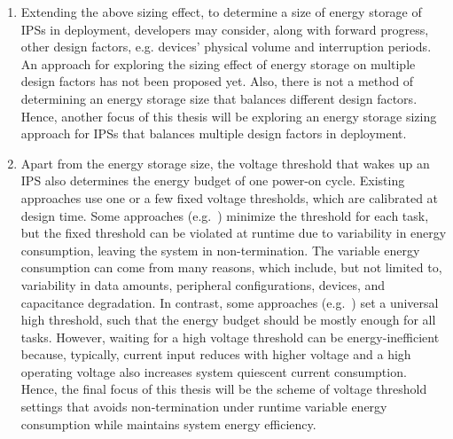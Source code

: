 \begin{enumerate}
\item 
Extending the above sizing effect, to determine a size of energy storage of IPSs in deployment, developers may consider, along with forward progress, other design factors, e.g. devices' physical volume and interruption periods. 
An approach for exploring the sizing effect of energy storage on multiple design factors has not been proposed yet. 
Also, there is not a method of determining an energy storage size that balances different design factors. 
Hence, another focus of this thesis will be exploring an energy storage sizing approach for IPSs that balances multiple design factors in deployment.  

\item 
Apart from the energy storage size, the voltage threshold that wakes up an IPS also determines the energy budget of one power-on cycle. 
Existing approaches use one or a few fixed voltage thresholds, which are calibrated at design time. 
Some approaches (e.g.~\cite{gomez2016dynamic}) minimize the threshold for each task, but the fixed threshold can be violated at runtime due to variability in energy consumption, leaving the system in non-termination. 
The variable energy consumption can come from many reasons, which include, but not limited to, variability in data amounts, peripheral configurations, devices, and capacitance degradation. 
In contrast, some approaches (e.g.~\cite{maeng2019supporting}) set a universal high threshold, such that the energy budget should be mostly enough for all tasks. 
However, waiting for a high voltage threshold can be energy-inefficient because, typically, current input reduces with higher voltage and a high operating voltage also increases system quiescent current consumption. 
Hence, the final focus of this thesis will be the scheme of voltage threshold settings that avoids non-termination under runtime variable energy consumption while maintains system energy efficiency. 

\end{enumerate}

